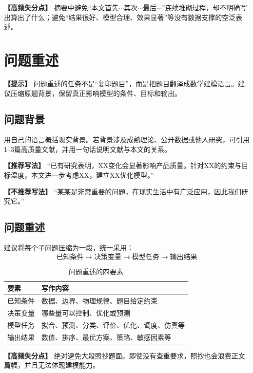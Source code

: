 \documentclass[12pt,a4paper]{article}
\newcommand{\tip}[1]{\par\noindent\textbf{【提示】} #1\par}
\newcommand{\warning}[1]{\par\noindent\textbf{【高频失分点】} #1\par}
\newcommand{\good}[1]{\par\noindent\textbf{【推荐写法】} #1\par}
\newcommand{\bad}[1]{\par\noindent\textbf{【不推荐写法】} #1\par}
\begin{document}
\warning{摘要中避免“本文首先$\cdots$其次$\cdots$最后$\cdots$”连续堆砌过程，却不明确写出算出了什么；避免“结果很好、模型合理、效果显著”等没有数据支撑的空泛表述。}

 

\clearpage

\section{问题重述}

\tip{问题重述的任务不是“复印题目”，而是把题目翻译成数学建模语言。建议压缩原题背景，保留真正影响模型的条件、目标和输出。}

\subsection{问题背景}

用自己的语言概括现实背景。若背景涉及成熟理论、公开数据或他人研究，可引用1--3篇高质量文献，并用一句话说明文献与本文的关系。\

\good{“已有研究表明，XX变化会显著影响产品质量。针对XX的约束与目标温度，本文进一步考虑XX，建立XX优化模型。”}
\bad{“某某是非常重要的问题，在现实生活中有广泛应用，因此我们研究它。”}

\subsection{问题重述}

建议将每个子问题压缩为一段，统一采用：
\[
\text{已知条件}\rightarrow\text{决策变量}\rightarrow\text{模型任务}\rightarrow\text{输出结果}
\]

\begin{table}[H]
\centering
\caption{问题重述的四要素}
\begin{tabular}{p{3cm}p{10cm}}
\toprule
要素 & 写作内容 \\
\midrule
已知条件 & 数据、边界、物理规律、题目给定约束 \\
决策变量 & 哪些量可以控制、优化或预测 \\
模型任务 & 拟合、预测、分类、评价、优化、调度、仿真等 \\
输出结果 & 数值、排序、最优方案、策略、敏感因素等 \\
\bottomrule
\end{tabular}
\end{table}

\warning{绝对避免大段照抄题面。即使没有查重要求，照抄也会浪费正文篇幅，并且无法体现建模能力。}
\end{document}
